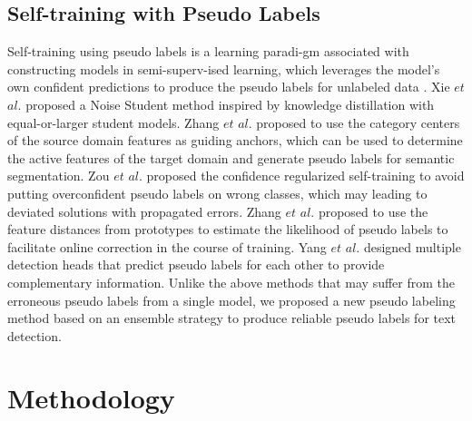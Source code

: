 \subsection{Self-training with Pseudo Labels}
Self-training using pseudo labels is a learning paradi-gm associated with constructing models in semi-superv-ised learning, which leverages the model’s own confident predictions to produce the pseudo labels for unlabeled data \citep{noisestudent,cag,zhang2021towards}. Xie $et$ $al$. \citep{noisestudent} proposed a Noise Student method inspired by knowledge distillation with equal-or-larger student models. Zhang $et$ $al$. \citep{cag} proposed to use the category centers of the source domain features as guiding anchors, which can be used to determine the active features of the target domain and generate pseudo labels for semantic segmentation. Zou $et$ $al$. \citep{crst} proposed the confidence regularized self-training to avoid putting overconfident pseudo labels on wrong classes, which may leading to deviated solutions with propagated errors. Zhang $et$ $al$. \citep{prototypical} proposed to use the feature distances from prototypes to estimate the likelihood of pseudo labels to facilitate online correction in the course of training. Yang $et$ $al$. \citep{interactive} designed multiple detection heads that predict pseudo labels for each other to provide complementary information. Unlike the above methods that may suffer from the erroneous pseudo labels from a single model, we proposed a new pseudo labeling method based on an ensemble strategy to produce reliable pseudo labels for text detection.



\section{Methodology}

